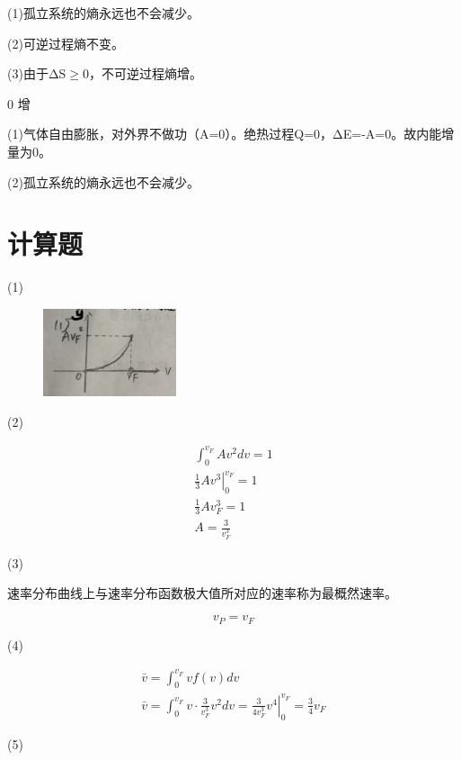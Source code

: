 \documentclass[b5paper,opensource]{./template/qyxf-book}
\begin{document}
\solve
(1)孤立系统的熵永远也不会减少。

(2)可逆过程熵不变。

(3)由于ΔS$\geqslant 0$，不可逆过程熵增。


0 \qquad 增

\solve(1)气体自由膨胀，对外界不做功（A=0）。绝热过程Q=0，ΔE=-A=0。故内能增量为0。

(2)孤立系统的熵永远也不会减少。


\section{计算题}

\solve
(1)
\begin{figure}[!ht]
	\centering
	\includegraphics[width=0.35\textwidth]{Chp12_21.jpg}
\end{figure}

(2)

$$
\begin{array} { c }
 { \int _ { 0 } ^ { v _ { F } } A v ^ { 2 } d v = 1 } \\ { \left. \frac { 1 } { 3 } A v ^ { 3 } \right| _ { 0 } ^ { v _ { F } } = 1 } \\ { \frac { 1 } { 3 } A v _ { F } ^ { 3 } = 1 } \\ { A = \frac { 3 } { v _ { F } ^ { 3 } } }
 \end{array}
$$

(3)

速率分布曲线上与速率分布函数极大值所对应的速率称为最概然速率。

$$ v_P=v_F $$

(4)

$$
\begin{array} { c } 
{ \bar { v } = \int _ { 0 } ^ { v _ { F } } v f ( v ) d v } \\ { \bar { v } = \int _ { 0 } ^ { v _ { F } } v \cdot \frac { 3 } { v _ { F } ^ { 3 } } v ^ { 2 } d v = \left. \frac { 3 } { 4 v _ { F } ^ { 3 } } v ^ { 4 } \right| _ { 0 } ^ { v _ { F } } = \frac { 3 } { 4 } v _ { F } } 
\end{array}
$$

(5)
\end{document}
